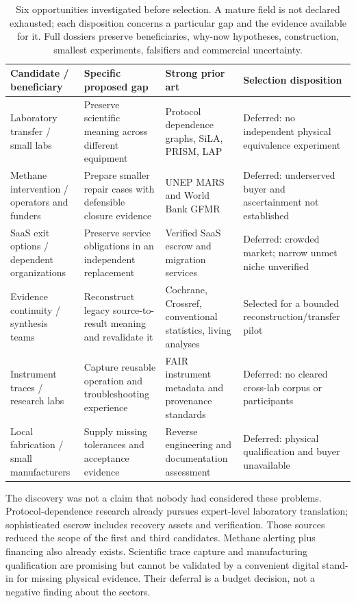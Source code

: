 \begin{table}[htbp]
\small
\begin{tabularx}{\textwidth}{p{}YYY}
\toprule
Candidate / beneficiary & Specific proposed gap & Strong prior art & Selection disposition\\
\midrule
Laboratory transfer / small labs & Preserve scientific meaning across different equipment & Protocol dependence graphs, SiLA, PRISM, LAP & Deferred: no independent physical equivalence experiment\\
Methane intervention / operators and funders & Prepare smaller repair cases with defensible closure evidence & UNEP MARS and World Bank GFMR & Deferred: underserved buyer and ascertainment not established\\
SaaS exit options / dependent organizations & Preserve service obligations in an independent replacement & Verified SaaS escrow and migration services & Deferred: crowded market; narrow unmet niche unverified\\
Evidence continuity / synthesis teams & Reconstruct legacy source-to-result meaning and revalidate it & Cochrane, Crossref, conventional statistics, living analyses & Selected for a bounded reconstruction/transfer pilot\\
Instrument traces / research labs & Capture reusable operation and troubleshooting experience & FAIR instrument metadata and provenance standards & Deferred: no cleared cross-lab corpus or participants\\
Local fabrication / small manufacturers & Supply missing tolerances and acceptance evidence & Reverse engineering and documentation assessment & Deferred: physical qualification and buyer unavailable\\
\bottomrule
\end{tabularx}
\caption{Six opportunities investigated before selection. A mature field is not declared exhausted; each disposition concerns a particular gap and the evidence available for it. Full dossiers preserve beneficiaries, why-now hypotheses, construction, smallest experiments, falsifiers and commercial uncertainty.}
\end{table}

The discovery was not a claim that nobody had considered these problems. Protocol-dependence research already pursues expert-level laboratory translation; sophisticated escrow includes recovery assets and verification. Those sources reduced the scope of the first and third candidates.\citep{protocol,escode} Methane alerting plus financing also already exists.\citep{mars,gfmr} Scientific trace capture and manufacturing qualification are promising but cannot be validated by a convenient digital stand-in for missing physical evidence. Their deferral is a budget decision, not a negative finding about the sectors.

